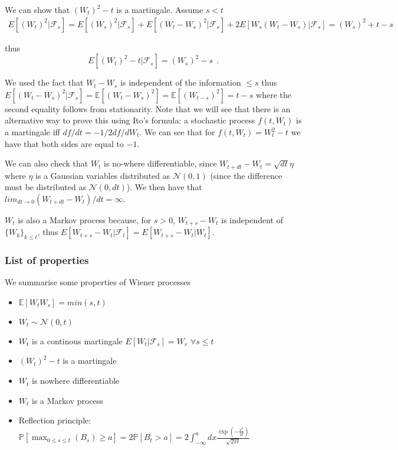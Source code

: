 \documentclass[11pt,a4paper]{article}
\begin{document}
We can show that $(W_t)^2-t$ is a martingale.
Assume $s<t$
\begin{eqnarray}
    E[(W_t)^2|\mathcal{F}_s] = E[(W_s)^2|\mathcal{F}_s] + E[(W_t-W_s)^2|\mathcal{F}_s] + 2E[W_s(W_t-W_s)|\mathcal{F}_s] = (W_s)^2 +t-s
\end{eqnarray}

thus
\begin{equation}
    E[(W_t)^2-t|\mathcal{F}_s] = (W_s)^2-s  \hspace{5pt}.  
\end{equation}

We used the fact that $W_t-W_s$ is independent of the information $\leq s$ thus $E[(W_t-W_s)^2|\mathcal{F}_s] = \mathbb{E}[(W_t-W_s)^2] =\mathbb{E}[(W_{t-s})^2] = t-s$ where the second equality follows from stationarity.
Note that we will see that there is an alternative way to prove this using Ito's formula: a stochastic process $f(t,W_t)$ is a martingale iff $df/dt = -1/2 df/dW_t$. We can see that for $f(t,W_t) = W^2_t-t$ we have that both sides are equal to $-1$.

We can also check that $W_t$ is no-where differentiable, since $W_{t+dt} -W_{t} = \sqrt{dt}\eta$ where $\eta$ is a Gaussian variables distributed as $\mathcal{N}(0,1)$ (since the difference must be distributed as $\mathcal{N}(0,dt)$). We then have that $lim_{dt \to 0} (W_{t+dt} -W_{t})/dt = \infty$.

$W_t$ is also a Markov process because, for $s>0$, $W_{t+s}-W_{t}$ is independent of $\{W_k\}_{k\leq t}$, thus $E[W_{t+s}-W_{t}|\mathcal{F}_t] = E[W_{t+s}-W_{t}|W_t]$.


\subsubsection{List of properties}

We summarise some properties of Wiener processes

\begin{itemize}
    \item $\mathbb{E}[W_tW_s] = min(s,t)$
    \item $W_t \sim \mathcal{N}(0,t)$
    \item $W_t$ is a continous martingale $E[W_t|\mathcal{F}_s] = W_s$ $\forall s\leq t$
    \item $(W_t)^2-t$ is a martingale
    \item $W_t$ is nowhere differentiable
    \item $W_t$ is a Markov process
    \item Reflection principle: $\mathbb{P}[\max_{0\leq s    \leq t}(B_s) \geq a] = 2\mathbb{P}[B_t > a] = 2 \int_{-\infty}^{a} dx \frac{\exp(-\frac{x^2}{2t})}{\sqrt{2 \pi t}}$
\end{itemize}
\end{document}
